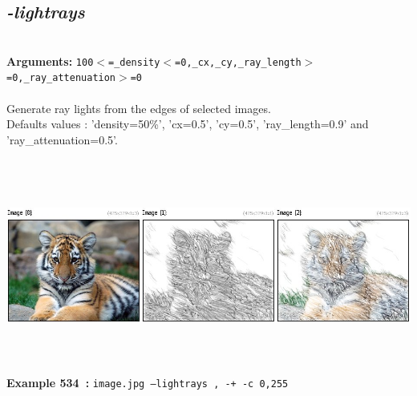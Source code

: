 \documentclass[a4paper,11pt,twoside]{book}
\begin{document}
\subsection{\emph{-lightrays} }\vspace*{-0.5em}
~\\\textbf{Arguments: } 
{\small \texttt{100$<$=\_density$<$=0,\_cx,\_cy,\_ray\_length$>$=0,\_ray\_attenuation$>$=0}}\\~\\
Generate ray lights from the edges of selected images.
~\\Defaults values : 'density=50\%', 'cx=0.5', 'cy=0.5', 'ray\_length=0.9' and 'ray\_attenuation=0.5'.
\begin{center}\includegraphics[keepaspectratio=true,height=7cm,width=\textwidth]{img/gmic_def534.jpg}\\
{\footnotesize \textbf{Example 534~:} \texttt{image.jpg --lightrays , -+ -c 0,255}}
\end{center}
\end{document}
